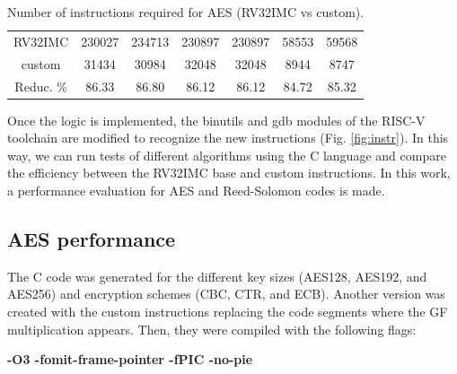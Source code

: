 \begin{table}[tp]
\begin{tabular}{ccccccc}
    \cellcolor[HTML]{EFEFEF}RV32IMC      & 230027               & 234713               & 230897               & 230897               & 58553                & 59568                \\
    \cellcolor[HTML]{EFEFEF}custom       & 31434                & 30984                & 32048                & 32048                & 8944                 & 8747                 \\
    \cellcolor[HTML]{EFEFEF}Reduc. \%    & 86.33                & 86.80                & 86.12                & 86.12                & 84.72                & 85.32               
    \end{tabular}
    \caption{Number of instructions required for AES (RV32IMC vs custom).}
    \label{tab:aes}
    \end{table}

Once the logic is implemented, the binutils and gdb modules of the RISC-V toolchain are modified to recognize the new instructions (Fig. \ref{fig:instr}).
In this way, we can run tests of different algorithms using the C language and compare the efficiency between the RV32IMC base and custom instructions.
In this work, a performance evaluation for AES and Reed-Solomon codes is made.

\subsection{AES performance} 

The C code was generated for the different key sizes (AES128, AES192, and AES256) and encryption schemes (CBC, CTR, and ECB). Another version was created with the custom instructions replacing
the code segments where the GF multiplication appears. 
Then, they were compiled with the following flags: 

\begin{center}
\textbf{-O3 -fomit-frame-pointer -fPIC -no-pie}
\end{center}

